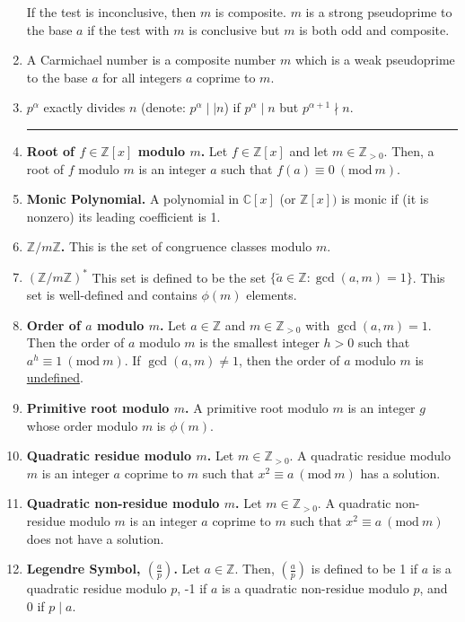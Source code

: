 \documentclass[12pt]{article}
\theoremstyle{definition}
\theoremstyle{named}
\newcommand{\Mod}[1]{\ (\mathrm{mod}\ #1)}
\begin{document}
\begin{enumerate}
\begin{enumerate}
        \end{enumerate}
    If the test is inconclusive, then $m$ is composite. $m$ is a strong pseudoprime to the base $a$ if the test with $m$ is conclusive but $m$ is both odd and composite. 
    \item A Carmichael number is a composite number $m$ which is a weak pseudoprime to the base $a$ for all integers $a$ coprime to $m$. 
    \item $p^\alpha$ exactly divides $n$ (denote: $p^\alpha \mid\mid n$) if $p^\alpha \mid n$ but $p^{\alpha + 1} \nmid n$. \\
    \begin{center}
        \hrule
    \end{center}
    \item \textbf{Root of $f \in \mathbb{Z}[x]$ modulo $m$. } Let $f \in \mathbb{Z}[x]$ and let $m \in \mathbb{Z}_{>0}$. Then, a root of $f$ modulo $m$ is an integer $a$ such that $f(a) \equiv 0 \Mod{m}$. 
    \item \textbf{Monic Polynomial. } A polynomial in $\mathbb{C}[x]$ (or $\mathbb{Z}[x])$ is monic if (it is nonzero) its leading coefficient is 1. 
    \item \textbf{$\mathbb{Z}/m\mathbb{Z}$. } This is the set of congruence classes modulo $m$. 
    \item \textbf{$\left(\mathbb{Z}/m\mathbb{Z}\right)^\ast$} This set is defined to be the set $\{\tilde{a} \in \mathbb{Z} : \gcd(a,m) = 1\}$. This set is well-defined and contains $\phi(m)$ elements. 
    \item \textbf{Order of $a$ modulo $m$. } Let $a \in \mathbb{Z}$ and $m \in \mathbb{Z}_{>0}$ with $\gcd(a,m) = 1$. Then the order of $a$ modulo $m$ is the smallest integer $h > 0$ such that $a^h \equiv 1 \Mod{m}$. If $\gcd(a,m) \neq 1$, then the order of $a$ modulo $m$ is \underline{undefined}. 
    \item \textbf{Primitive root modulo $m$. } A primitive root modulo $m$ is an integer $g$ whose order modulo $m$ is $\phi(m)$. 
    \item \textbf{Quadratic residue modulo $m$. } Let $m \in \mathbb{Z}_{>0}$. A quadratic residue modulo $m$ is an integer $a$ coprime to $m$ such that $x^2 \equiv a \Mod{m}$ has a solution. 
    \item \textbf{Quadratic non-residue modulo $m$. } Let $m \in \mathbb{Z}_{>0}$. A quadratic non-residue modulo $m$ is an integer $a$ coprime to $m$ such that $x^2 \equiv a \Mod{m}$ does not have a solution. 
    \item \textbf{Legendre Symbol, $\left(\frac{a}{p}\right)$. } Let $a \in \mathbb{Z}$. Then, $\left(\frac{a}{p}\right)$ is defined to be 1 if $a$ is a quadratic residue modulo $p$, -1 if $a$ is a quadratic non-residue modulo $p$, and 0 if $p \mid a$. 

\end{enumerate}
\end{document}
